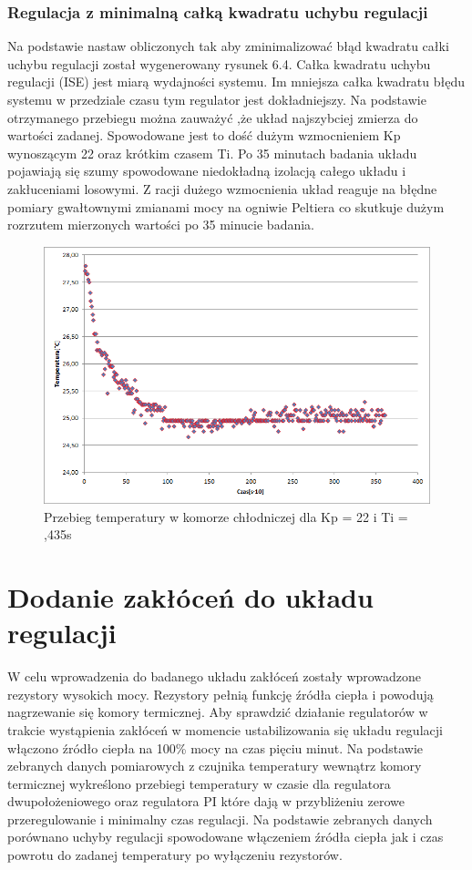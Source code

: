 \documentclass[oneside]{mgr}
\begin{document}
\subsubsection{Regulacja z minimalną całką kwadratu uchybu regulacji}
Na podstawie nastaw obliczonych tak aby zminimalizować błąd kwadratu całki uchybu regulacji został wygenerowany rysunek 6.4. Całka kwadratu uchybu regulacji (ISE) jest miarą wydajności systemu. Im mniejsza całka kwadratu błędu systemu w przedziale czasu tym regulator jest dokładniejszy. Na podstawie otrzymanego przebiegu można zauważyć ,że układ najszybciej zmierza do wartości zadanej. Spowodowane jest to dość dużym wzmocnieniem Kp wynoszącym 22 oraz krótkim czasem Ti. Po 35 minutach badania układu pojawiają się szumy spowodowane niedokładną izolacją całego układu i zakłuceniami losowymi. Z racji dużego wzmocnienia układ reaguje na błędne pomiary gwałtownymi zmianami mocy na ogniwie Peltiera co skutkuje dużym rozrzutem mierzonych wartości po 35 minucie badania. 

\begin{center}
\begin{figure}[h!]
    \centering
    \includegraphics[width=\textwidth]{ZN13.png}
    \caption{Przebieg temperatury w komorze chłodniczej dla Kp = 22 i Ti = ,435s}
    \end{figure}
\end{center}

\section{Dodanie zakłóceń do układu regulacji}
W celu wprowadzenia do badanego układu zakłóceń zostały wprowadzone rezystory wysokich mocy. Rezystory pełnią funkcję źródła ciepła i powodują nagrzewanie się komory termicznej. Aby sprawdzić działanie regulatorów w trakcie wystąpienia zakłóceń w momencie ustabilizowania się układu regulacji włączono źródło ciepła na 100\% mocy na czas pięciu minut. Na podstawie zebranych danych pomiarowych z czujnika temperatury wewnątrz komory termicznej wykreślono przebiegi temperatury w czasie dla regulatora dwupołożeniowego oraz regulatora PI które dają w przybliżeniu zerowe przeregulowanie i minimalny czas regulacji. Na podstawie zebranych danych porównano uchyby regulacji spowodowane włączeniem źródła ciepła jak i czas powrotu do zadanej temperatury po wyłączeniu rezystorów.
\end{document}
